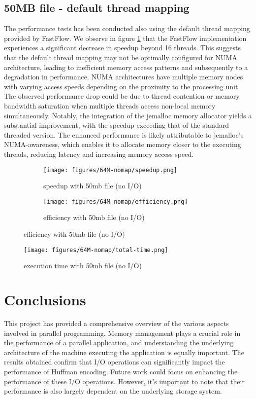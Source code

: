 \documentclass{article}
\begin{document}
\subsection{50MB file - default thread mapping}
The performance tests has been conducted also using the default thread mapping provided by FastFlow.
We observe in figure  \ref{fig:speedup-nomap} that the FastFlow implementation experiences a significant decrease in speedup beyond 16 threads.
This suggests that the default thread mapping may not be optimally configured for NUMA architecture,
leading to inefficient memory access patterns and subsequently to a degradation in performance.
NUMA architectures have multiple memory nodes with varying access speeds depending on the proximity to the processing unit.
The observed performance drop could be due to thread contention or memory bandwidth saturation when multiple threads access
non-local memory simultaneously.
Notably, the integration of the jemalloc memory allocator yields a substantial improvement,
with the speedup exceeding that of the standard threaded version.
The enhanced performance is likely attributable to jemalloc's NUMA-awareness,
which enables it to allocate memory closer to the executing threads, reducing latency and increasing memory access speed.

\begin{figure}[H]
    \begin{subfigure}{0.6\textwidth}
        \centering
        \texttt{[image: figures/64M-nomap/speedup.png]}
        \caption{speedup with 50mb file (no I/O)}
        \label{fig:speedup-nomap}
    \end{subfigure}
    \begin{subfigure}{0.6\textwidth}
        \centering
        \texttt{[image: figures/64M-nomap/efficiency.png]}
        \caption{efficiency with 50mb file (no I/O)}
        \label{fig:efficiency-nomap}
    \end{subfigure}
\end{figure}
\begin{figure}[H]
        \centering
        \texttt{[image: figures/64M-nomap/total-time.png]}
        \caption{execution time with 50mb file (no I/O)}
        \label{fig:total-time-nomap}
\end{figure}

\section {Conclusions}
This project has provided a comprehensive overview of the various aspects involved in parallel programming.
Memory management plays a crucial role in the performance of a parallel application, and understanding the
underlying architecture of the machine executing the application is equally important. The results obtained
confirm that I/O operations can significantly impact the performance of Huffman encoding. Future work could
focus on enhancing the performance of these I/O operations. However, it's important to note that their performance
is also largely dependent on the underlying storage system.
\end{document}
